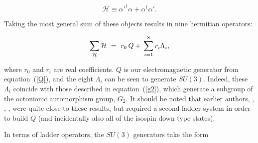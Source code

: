 \documentclass[letterpaper,12pt,titlepage,oneside,final]{book}
\newcommand{\spacer}{0.2cm}
\begin{document}
\begin{equation}
\mathcal{H}\equiv \alpha'^{\dagger}\alpha  +   \alpha^{\dagger}\alpha'.
\end{equation}

\noindent Taking the most general sum of these objects results in nine hermitian operators:

\begin{equation}\label{unique}
\sum_{\mathcal{H}} \mathcal{H}\hspace{1.2mm} = \hspace{1.2mm}r_0\hspace{0.7mm}Q+\hspace{0.7mm}\sum_{i=1}^8 r_i\Lambda_i,
\end{equation}

\noindent where $r_0$ and $r_i$ are real coefficients.  $Q$ is our electromagnetic generator from equation~(\ref{Q}), and the eight $\Lambda_i$ can be seen to generate $SU(3)$.   Indeed, these $\Lambda_i$ coincide with those described in equation~(\ref{g2}), which generate a subgroup of the octonionic automorphism group, $G_2$.  It should be noted that earlier authors, \cite{Grass}, \cite{wow}, \cite{wowagain}, were quite close to these results, but required a second ladder system in order to build $Q$ (and incidentally also all of the isospin down type states). 




In terms of ladder operators, the $SU(3)$ generators take the form
\end{document}
